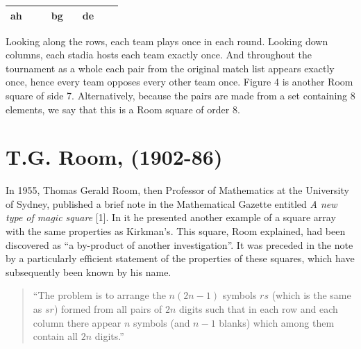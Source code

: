 \documentclass[
  12pt,
  a4paper]{book}
\begin{document}
\begin{longtable}[]{@{}cccccccc@{}}
\begin{minipage}[t]{0.05\columnwidth}
ah\strut
\end{minipage} & \begin{minipage}[t]{0.05\columnwidth}\centering
\strut
\end{minipage} & \begin{minipage}[t]{0.05\columnwidth}\centering
\strut
\end{minipage} & \begin{minipage}[t]{0.05\columnwidth}\centering
bg\strut
\end{minipage} & \begin{minipage}[t]{0.05\columnwidth}\centering
\strut
\end{minipage} & \begin{minipage}[t]{0.05\columnwidth}\centering
de\strut
\end{minipage}\tabularnewline
\bottomrule
\end{longtable}

Looking along the rows, each team plays once in each round. Looking down
columns, each stadia hosts each team exactly once. And throughout the
tournament as a whole each pair from the original match list appears
exactly once, hence every team opposes every other team once. Figure 4
is another Room square of side 7. Alternatively, because the pairs are
made from a set containing 8 elements, we say that this is a Room square
of order 8.

\hypertarget{t.g.-room-1902-86}{%
\section{T.G. Room, (1902-86)}\label{t.g.-room-1902-86}}

In 1955, Thomas Gerald Room, then Professor of Mathematics at the
University of Sydney, published a brief note in the Mathematical Gazette
entitled \emph{A new type of magic square} {[}1{]}. In it he presented another
example of a square array with the same properties as Kirkman's. This
square, Room explained, had been discovered as ``a by-product of
another investigation''. It was preceded in the note by a particularly
efficient statement of the properties of these squares, which have
subsequently been known by his name.

\begin{quote}
``The problem is to arrange the \(n(2n-1)\) symbols \(rs\) (which is the
same as \(sr\)) formed from all pairs of \(2n\) digits such that in each
row and each column there appear \(n\) symbols (and \(n-1\) blanks) which
among them contain all \(2n\) digits.''
\end{quote}
\end{document}

